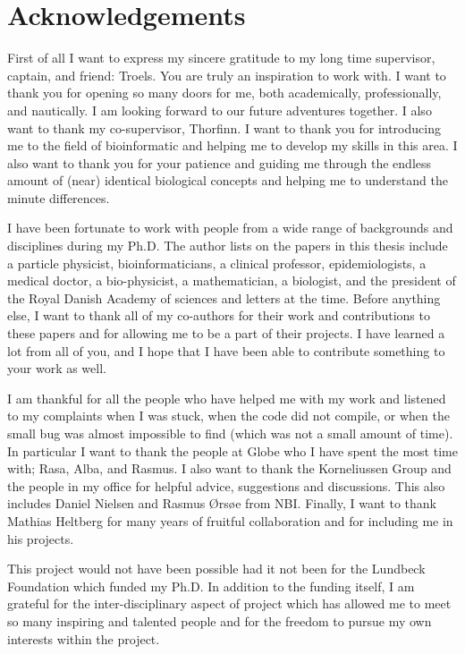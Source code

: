 \chapter{Acknowledgements}

First of all I want to express my sincere gratitude to my long time supervisor, captain, and friend: Troels. You are truly an inspiration to work with. I want to thank you for opening so many doors for me, both academically, professionally, and nautically. I am looking forward to our future adventures together.
I also want to thank my co-supervisor, Thorfinn. I want to thank you for introducing me to the field of bioinformatic and helping me to develop my skills in this area. I also want to thank you for your patience and guiding me through the endless amount of (near) identical biological concepts and helping me to understand the minute differences.

I have been fortunate to work with people from a wide range of backgrounds and disciplines during my Ph.D. The author lists on the papers in this thesis include a particle physicist, bioinformaticians, a clinical professor, epidemiologists, a medical doctor, a bio-physicist, a mathematician, a biologist, and the president of the Royal Danish Academy of sciences and letters at the time. Before anything else, I want to thank all of my co-authors for their work and contributions to these papers and for allowing me to be a part of their projects. I have learned a lot from all of you, and I hope that I have been able to contribute something to your work as well.

I am thankful for all the people who have helped me with my work and listened to my complaints when I was stuck, when the code did not compile, or when the small bug was almost impossible to find (which was not a small amount of time). In particular I want to thank the people at Globe who I have spent the most time with; Rasa, Alba, and Rasmus. I also want to thank the Korneliussen Group and the people in my office for helpful advice, suggestions and discussions. This also includes Daniel Nielsen and Rasmus Ørsøe from NBI. Finally, I want to thank Mathias Heltberg for many years of fruitful collaboration and for including me in his projects.

This project would not have been possible had it not been for the Lundbeck Foundation which funded my Ph.D. In addition to the funding itself, I am grateful for the inter-disciplinary aspect of project which has allowed me to meet so many inspiring and talented people and  for the freedom to pursue my own interests within the project.

